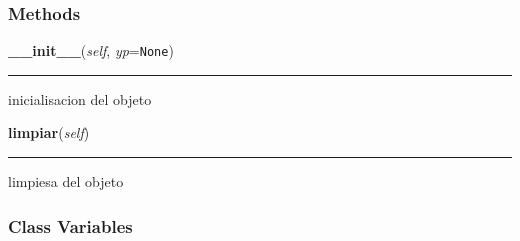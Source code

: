   \subsubsection{Methods}

    \label{astroplot_s:skypeaksky:__init__}

    \vspace{0.5ex}

\hspace{.8\funcindent}\begin{boxedminipage}{\funcwidth}

    \raggedright \textbf{\_\_init\_\_}(\textit{self}, \textit{yp}={\tt None})

    \vspace{-1.5ex}

    \rule{\textwidth}{0.5\fboxrule}
\setlength{\parskip}{2ex}
    inicialisacion del objeto

\setlength{\parskip}{1ex}
    \end{boxedminipage}

    \label{astroplot_s:skypeaksky:limpiar}

    \vspace{0.5ex}

\hspace{.8\funcindent}\begin{boxedminipage}{\funcwidth}

    \raggedright \textbf{limpiar}(\textit{self})

    \vspace{-1.5ex}

    \rule{\textwidth}{0.5\fboxrule}
\setlength{\parskip}{2ex}
    limpiesa del objeto

\setlength{\parskip}{1ex}
    \end{boxedminipage}



  \subsubsection{Class Variables}


